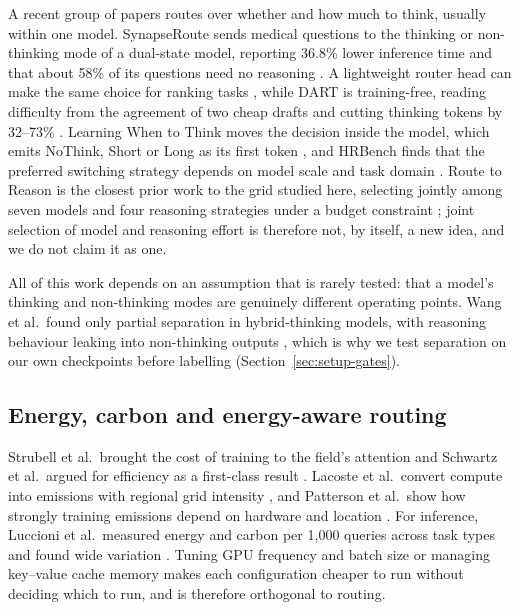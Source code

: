 \documentclass[final,5p,times,twocolumn]{elsarticle}
\theoremstyle{plain}
\begin{document}
A recent group of papers routes over whether and how much to think, usually
within one model. SynapseRoute sends medical questions to the thinking or
non-thinking mode of a dual-state model, reporting 36.8\% lower inference
time and that about 58\% of its questions need no reasoning
\cite{zhang2025synapseroute}. A lightweight router head can make the same
choice for ranking tasks \cite{guo2026thinkwhenneeded}, while DART is
training-free, reading difficulty from the agreement of two cheap drafts and
cutting thinking tokens by 32--73\% \cite{lee2026dart}. Learning
When to Think moves the decision inside the model, which emits NoThink, Short
or Long as its first token \cite{kassenaar2026learningwhentothink}, and
HRBench finds that the preferred switching strategy depends on model scale
and task domain \cite{ning2026hrbench}. Route to Reason is the closest prior
work to the grid studied here, selecting jointly among seven models and four
reasoning strategies under a budget constraint \cite{pan2026routetoreason};
joint selection of model and reasoning effort is therefore not, by itself, a
new idea, and we do not claim it as one.

All of this work depends on an assumption that is rarely tested: that a
model's thinking and non-thinking modes are genuinely different operating
points. Wang et al.\ found only partial separation in hybrid-thinking models,
with reasoning behaviour leaking into non-thinking outputs
\cite{wang2025demystifying}, which is why we test separation on our own
checkpoints before labelling (Section~\ref{sec:setup-gates}).

\subsection{Energy, carbon and energy-aware routing}
\label{sec:related-energy}

Strubell et al.\ brought the cost of training to the field's attention
\cite{strubell2019energy} and Schwartz et al.\ argued for efficiency as a
first-class result \cite{schwartz2020greenai}. Lacoste et al.\ convert
compute into emissions with regional grid intensity
\cite{lacoste2019quantifying}, and Patterson et al.\ show how strongly
training emissions depend on hardware and location \cite{patterson2021carbon}.
For inference, Luccioni et al.\ measured energy and carbon per 1{,}000
queries across task types and found wide variation
\cite{luccioni2024powerhungry}. Tuning GPU frequency and batch size
\cite{xu2025camel} or managing key--value cache memory \cite{kwon2023vllm}
makes each configuration cheaper to run without deciding which to run, and is
therefore orthogonal to routing.
\end{document}
